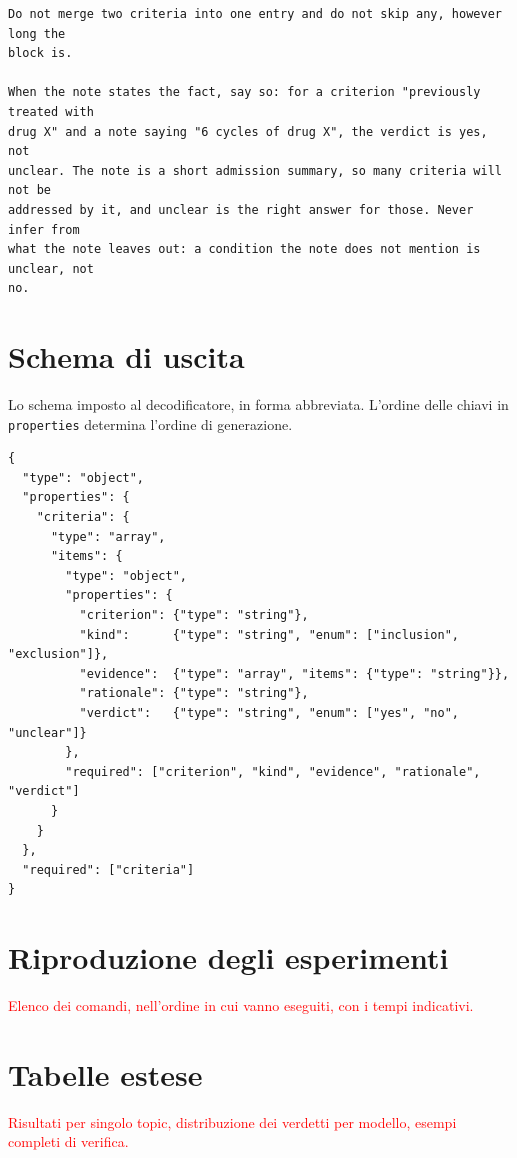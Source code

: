 \documentclass[pdflatex,sn-mathphys-num]{sn-jnl}
\theoremstyle{thmstyleone}
\theoremstyle{thmstyletwo}
\theoremstyle{thmstylethree}
\newcommand{\ev}[1]{\textcolor{red}{#1}}
\begin{document}
\begin{appendices}
\begin{lstlisting}[style=promptstyle]
Do not merge two criteria into one entry and do not skip any, however long the
block is.

When the note states the fact, say so: for a criterion "previously treated with
drug X" and a note saying "6 cycles of drug X", the verdict is yes, not
unclear. The note is a short admission summary, so many criteria will not be
addressed by it, and unclear is the right answer for those. Never infer from
what the note leaves out: a condition the note does not mention is unclear, not
no.
\end{lstlisting}

\section{Schema di uscita}\label{app:schema}

Lo schema imposto al decodificatore, in forma abbreviata. L'ordine delle chiavi in \texttt{properties} determina l'ordine di generazione.

\begin{lstlisting}[style=Python]
{
  "type": "object",
  "properties": {
    "criteria": {
      "type": "array",
      "items": {
        "type": "object",
        "properties": {
          "criterion": {"type": "string"},
          "kind":      {"type": "string", "enum": ["inclusion", "exclusion"]},
          "evidence":  {"type": "array", "items": {"type": "string"}},
          "rationale": {"type": "string"},
          "verdict":   {"type": "string", "enum": ["yes", "no", "unclear"]}
        },
        "required": ["criterion", "kind", "evidence", "rationale", "verdict"]
      }
    }
  },
  "required": ["criteria"]
}
\end{lstlisting}

\section{Riproduzione degli esperimenti}\label{app:riproduzione}

\ev{Elenco dei comandi, nell'ordine in cui vanno eseguiti, con i tempi indicativi.}

\section{Tabelle estese}\label{app:tabelle}

\ev{Risultati per singolo topic, distribuzione dei verdetti per modello, esempi completi di verifica.}

\end{appendices}
\end{document}
